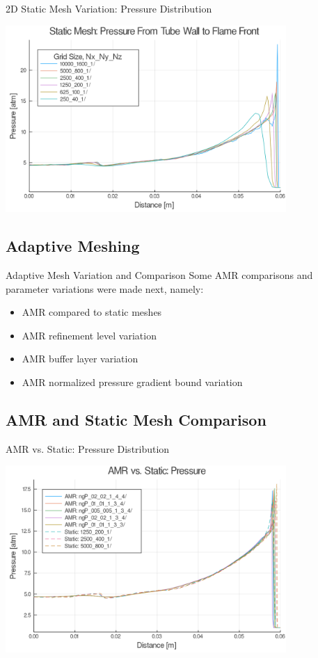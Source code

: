 \begin{frame}{2D Static Mesh Variation: Pressure Distribution}
\begin{center}
\includegraphics[width=0.8\textwidth]{../figs/staticfigs/p.png}
\end{center}
\end{frame}

\subsection{Adaptive Meshing}

\begin{frame}{Adaptive Mesh Variation and Comparison}
Some AMR comparisons and parameter variations were made next, namely:
\begin{itemize}
\item AMR compared to static meshes
\item AMR refinement level variation
\item AMR buffer layer variation
\item AMR normalized pressure gradient bound variation 
\end{itemize}
\end{frame}

\subsection{AMR and Static Mesh Comparison}

\begin{frame}{AMR vs. Static: Pressure Distribution}
\begin{center}
\includegraphics[width=0.8\textwidth]{../figs/amrfigs/amrcompare/p.png}
\end{center}
\end{frame}

